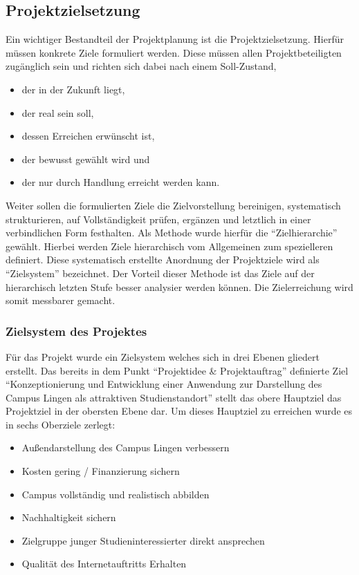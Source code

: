 \subsection{Projektzielsetzung}
\label{sec:Projektzielsetzung}

Ein wichtiger Bestandteil der Projektplanung ist die Projektzielsetzung. Hierfür
müssen konkrete Ziele formuliert werden. Diese müssen allen Projektbeteiligten
zugänglich sein und richten sich dabei nach einem Soll-Zustand,

\begin{itemize}
  \item der in der Zukunft liegt,
  \item der real sein soll,
  \item dessen Erreichen erwünscht ist,
  \item der bewusst gewählt wird und
  \item der nur durch Handlung erreicht werden kann.
\end{itemize}

Weiter sollen die formulierten Ziele die Zielvorstellung bereinigen,
systematisch strukturieren, auf Vollständigkeit prüfen, ergänzen und letztlich
in einer verbindlichen Form festhalten.  Als Methode wurde hierfür die
"`Zielhierarchie"' gewählt. Hierbei werden Ziele hierarchisch vom Allgemeinen zum
spezielleren definiert.  Diese systematisch erstellte Anordnung der
Projektziele wird als "`Zielsystem"' bezeichnet. Der Vorteil dieser Methode ist
das Ziele auf der hierarchisch letzten Stufe besser analysier werden können.
Die Zielerreichung wird somit messbarer gemacht.

\subsubsection{Zielsystem des Projektes}
\label{sec:Zielsystem}

Für das Projekt wurde ein Zielsystem welches sich in drei Ebenen gliedert
erstellt. Das bereits in dem Punkt "`Projektidee \& Projektauftrag"' definierte
Ziel "`Konzeptionierung und Entwicklung einer Anwendung zur Darstellung des
Campus Lingen als attraktiven Studienstandort"' stellt das obere Hauptziel das
Projektziel in der obersten Ebene dar. Um dieses Hauptziel zu erreichen wurde
es in sechs Oberziele zerlegt:

\begin{itemize}
  \item Außendarstellung des Campus Lingen verbessern
  \item Kosten gering / Finanzierung sichern
  \item Campus vollständig und realistisch abbilden
  \item Nachhaltigkeit sichern
  \item Zielgruppe junger Studieninteressierter direkt ansprechen
  \item Qualität des Internetauftritts Erhalten
\end{itemize}

